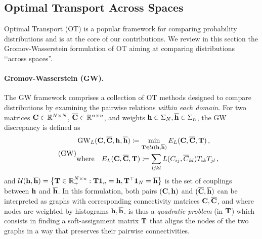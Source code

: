 
\subsection{Optimal Transport Across Spaces}

Optimal Transport (OT) \cite{villani2009optimal,peyre2019computational} is a popular
framework for comparing probability distributions and is at the core of our contributions. We review in this section the Gromov-Wasserstein formulation of OT aiming at comparing distributions ‘‘across spaces''.

\paragraph{Gromov-Wasserstein (GW).} The GW framework \cite{memoli2011gromov,sturm2012space} comprises a collection of OT methods designed to compare distributions by examining the pairwise relations \emph{within each domain}. For two matrices ${\mathbf{C}} \in \mathbb{R}^{N \times N}$, $\overline{{\mathbf{C}}} \in \mathbb{R}^{n \times n}$, and weights ${\mathbf{h}} \in \Sigma_N, \overline{{\mathbf{h}}} \in \Sigma_n$, the GW discrepancy is defined as
\begin{equation}
\label{eq:gw_pb} 
\tag{GW}
\begin{split}
	&\operatorname{GW}_L ({\mathbf{C}}, \overline{{\mathbf{C}}}, {\mathbf{h}}, \overline{{\mathbf{h}}}) \coloneqq \min_{{\mathbf{T}} \in {\mathcal{U}}({\mathbf{h}}, \overline{{\mathbf{h}}})} E_L({\mathbf{C}}, \overline{{\mathbf{C}}}, {\mathbf{T}})\,, \\
	&\text{where} \quad E_L({\mathbf{C}}, \overline{{\mathbf{C}}}, {\mathbf{T}}) \coloneqq \sum_{ijkl}  L(C_{ij}, \overline{C}_{kl}) T_{ik} T_{jl}\,,
\end{split}
\end{equation}
and ${\mathcal{U}}({\mathbf{h}}, \overline{{\mathbf{h}}}) = \left\{ {\mathbf{T}} \in \mathbb{R}_+^{N \times n} : {\mathbf{T}} \bm{1}_n = {\mathbf{h}}, {\mathbf{T}}^\top \bm{1}_N = \overline{{\mathbf{h}}} \right\}$ is the set of couplings between ${\mathbf{h}}$ and $\overline{{\mathbf{h}}}$.
In this formulation, both pairs $({\mathbf{C}}, {\mathbf{h}})$ and $(\overline{{\mathbf{C}}}, \overline{{\mathbf{h}}})$ can be interpreted as graphs with corresponding connectivity matrices ${\mathbf{C}}, \overline {{\mathbf{C}}}$, and where nodes are weighted by histograms ${\mathbf{h}}, \overline {{\mathbf{h}}}$.  is thus a \emph{quadratic problem} (in ${\mathbf{T}}$) which consists in finding a soft-assignment matrix ${\mathbf{T}}$ that aligns the nodes of the two graphs in a way that preserves their pairwise connectivities. 

